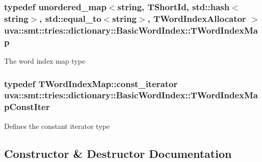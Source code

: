 \subsubsection[{T\+Word\+Index\+Map}]{\setlength{\rightskip}{0pt plus 5cm}typedef unordered\+\_\+map$<$string, {\bf T\+Short\+Id}, std\+::hash$<$string$>$, std\+::equal\+\_\+to$<$string$>$, {\bf T\+Word\+Index\+Allocator} $>$ {\bf uva\+::smt\+::tries\+::dictionary\+::\+Basic\+Word\+Index\+::\+T\+Word\+Index\+Map}}\label{classuva_1_1smt_1_1tries_1_1dictionary_1_1_basic_word_index_ab9afbbd6dda7d8579f804508ac094574}
The word index map type \hypertarget{classuva_1_1smt_1_1tries_1_1dictionary_1_1_basic_word_index_aedf00c11ba1f7ef5565ed7ed523087ec}{}
\subsubsection[{T\+Word\+Index\+Map\+Const\+Iter}]{\setlength{\rightskip}{0pt plus 5cm}typedef T\+Word\+Index\+Map\+::const\+\_\+iterator {\bf uva\+::smt\+::tries\+::dictionary\+::\+Basic\+Word\+Index\+::\+T\+Word\+Index\+Map\+Const\+Iter}}\label{classuva_1_1smt_1_1tries_1_1dictionary_1_1_basic_word_index_aedf00c11ba1f7ef5565ed7ed523087ec}
Defines the constant iterator type 

\subsection{Constructor \& Destructor Documentation}
\hypertarget{classuva_1_1smt_1_1tries_1_1dictionary_1_1_basic_word_index_a86bfea6c929c9886d2ab4d96bd50beef}{}
